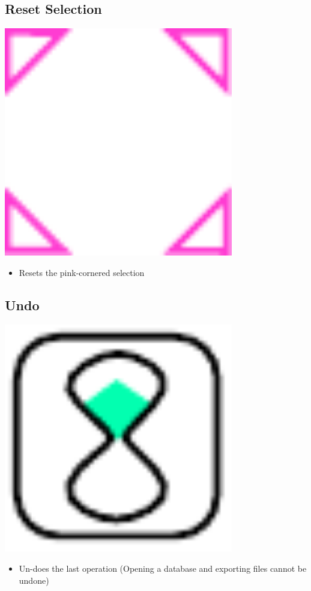 \subsection{Reset Selection}

\includegraphics[width=10cm]{../../gui/source/resources/edit_reset.pdf}
\begin{itemize}
\item Resets the pink-cornered selection
\end{itemize}

\subsection{Undo}

\includegraphics[width=10cm]{../../gui/source/resources/edit_undo.pdf}
\begin{itemize}
\item Un-does the last operation (Opening a database and exporting files cannot be undone)
\end{itemize}

